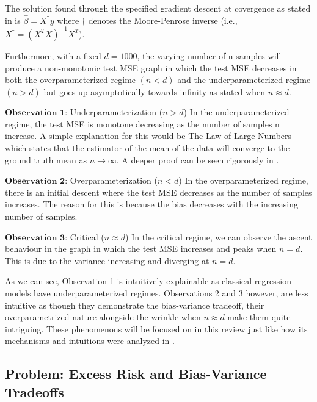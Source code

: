 \documentclass{article}
\begin{document}
The solution found through the specified gradient descent at covergence as stated in \cite{Nakkiran_2019} is $\hat{\beta} = X^{\dagger}y$ where $\dagger$ denotes the Moore-Penrose inverse (i.e., $X^{\dagger} = (X^{T}X)^{-1}X^{T}$).

Furthermore, with a fixed $d = 1000$, the varying number of n samples will produce a non-monotonic test MSE graph in which the test MSE decreases in both the overparameterized regime $(n < d)$ and the underparameterized regime $(n > d)$ but goes up asymptotically towards infinity as stated when $n \approx d$.

$\textbf{Observation 1}$: Underparameterization ($n > d$) \newline
In the underparameterized regime, the test MSE is monotone decreasing as the number of samples n increase. A simple explanation for this would be The Law of Large Numbers which states that the estimator of the mean of the data will converge to the ground truth mean as $n \rightarrow \infty$. A deeper proof can be seen rigorously in \cite{Hastie_2022}.

$\textbf{Observation 2}$: Overparameterization ($n < d$) \newline
In the overparameterized regime, there is an initial descent where the test MSE decreases as the number of samples increases. The reason for this is because the bias decreases with the increasing number of samples.

$\textbf{Observation 3}$: Critical ($n \approx d$) \newline 
In the critical regime, we can observe the ascent behaviour in the graph in which the test MSE increases and peaks when $n=d$. This is due to the variance increasing and diverging at $n=d$.

As we can see, Observation 1 is intuitively explainable as classical regression models have underparameterized regimes. Observations 2 and 3 however, are less intuitive as though they demonstrate the bias-variance tradeoff, their overparametrized nature alongside the wrinkle when $n \approx d$ make them quite intriguing. These phenomenons will be focused on in this review just like how its mechanisms and intuitions were analyzed in \cite{Nakkiran_2019}.

\newpage

\subsection{Problem: Excess Risk and Bias-Variance Tradeoffs}
\end{document}
